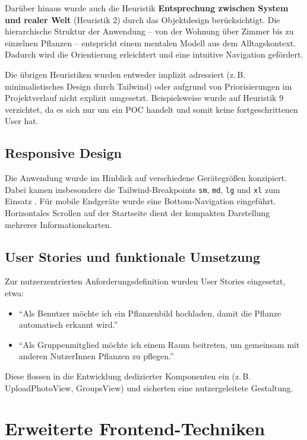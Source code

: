 Darüber hinaus wurde auch die Heuristik \textbf{Entsprechung zwischen System und realer Welt} (Heuristik 2) durch das Objektdesign berücksichtigt. Die hierarchische Struktur der Anwendung – von der Wohnung über Zimmer bis zu einzelnen Pflanzen – entspricht einem mentalen Modell aus dem Alltagskontext. Dadurch wird die Orientierung erleichtert und eine intuitive Navigation gefördert.

Die übrigen Heuristiken wurden entweder implizit adressiert (z.\,B. minimalistisches Design durch Tailwind) oder aufgrund von Priorisierungen im Projektverlauf nicht explizit umgesetzt. Beispielsweise wurde auf Heuristik 9 verzichtet, da es sich nur um ein \ac{POC} handelt und somit keine fortgeschrittenen User hat.

\subsection{Responsive Design}

Die Anwendung wurde im Hinblick auf verschiedene Gerätegrößen konzipiert. Dabei kamen insbesondere die Tailwind-Breakpoints \texttt{sm}, \texttt{md}, \texttt{lg} und \texttt{xl} zum Einsatz \cite{TailwindCSS}. Für mobile Endgeräte wurde eine Bottom-Navigation eingeführt. Horizontales Scrollen auf der Startseite dient der kompakten Darstellung mehrerer Informationskarten.

\subsection{User Stories und funktionale Umsetzung}

Zur nutzerzentrierten Anforderungsdefinition wurden User Stories eingesetzt, etwa:
\begin{itemize}
	\item \enquote{Als Benutzer möchte ich ein Pflanzenbild hochladen, damit die Pflanze automatisch erkannt wird.}
	\item \enquote{Als Gruppenmitglied möchte ich einem Raum beitreten, um gemeinsam mit anderen NutzerInnen Pflanzen zu pflegen.}
\end{itemize}
Diese flossen in die Entwicklung dedizierter Komponenten ein (z.\,B. UploadPhotoView, GroupsView) und sicherten eine nutzergeleitete Gestaltung.

\section{Erweiterte Frontend-Techniken}
\label{sec:frontend-erweitert}

